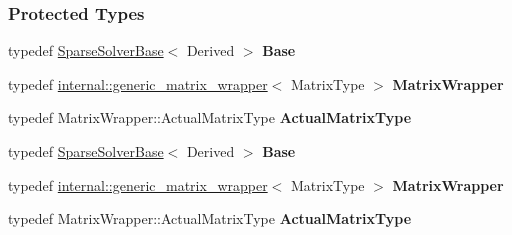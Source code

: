 \subsubsection*{Protected Types}
\begin{DoxyCompactItemize}
\item 
\mbox{\label{group___iterative_linear_solvers___module_aa1b0d2236c341b5144a36db443173282}} 
typedef \hyperlink{group___sparse_core___module_class_eigen_1_1_sparse_solver_base}{Sparse\+Solver\+Base}$<$ Derived $>$ {\bfseries Base}
\item 
\mbox{\label{group___iterative_linear_solvers___module_a05704025d4766af7c4a8190d000eb946}} 
typedef \hyperlink{class_eigen_1_1internal_1_1generic__matrix__wrapper}{internal\+::generic\+\_\+matrix\+\_\+wrapper}$<$ Matrix\+Type $>$ {\bfseries Matrix\+Wrapper}
\item 
\mbox{\label{group___iterative_linear_solvers___module_a483da55fcd8ca464e36f06af7e865bba}} 
typedef Matrix\+Wrapper\+::\+Actual\+Matrix\+Type {\bfseries Actual\+Matrix\+Type}
\item 
\mbox{\label{group___iterative_linear_solvers___module_aa1b0d2236c341b5144a36db443173282}} 
typedef \hyperlink{group___sparse_core___module_class_eigen_1_1_sparse_solver_base}{Sparse\+Solver\+Base}$<$ Derived $>$ {\bfseries Base}
\item 
\mbox{\label{group___iterative_linear_solvers___module_a05704025d4766af7c4a8190d000eb946}} 
typedef \hyperlink{class_eigen_1_1internal_1_1generic__matrix__wrapper}{internal\+::generic\+\_\+matrix\+\_\+wrapper}$<$ Matrix\+Type $>$ {\bfseries Matrix\+Wrapper}
\item 
\mbox{\label{group___iterative_linear_solvers___module_a483da55fcd8ca464e36f06af7e865bba}} 
typedef Matrix\+Wrapper\+::\+Actual\+Matrix\+Type {\bfseries Actual\+Matrix\+Type}
\end{DoxyCompactItemize}
